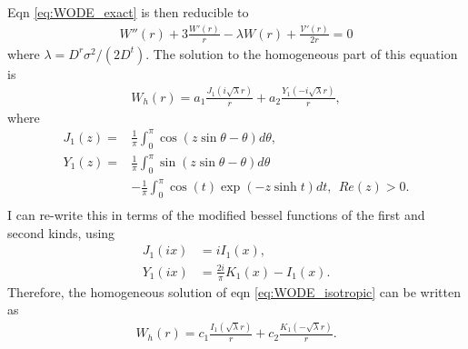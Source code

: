 \documentclass{article}
\begin{document}
Eqn \ref{eq:WODE_exact} is then reducible to
\begin{align}\label{eq:WODE_isotropic}
  W''(r)+3\frac{W'(r)}{r}-\lambda W(r)+\frac{\mathcal{V}'(r)}{2r}=0
\end{align}
where $\lambda=D^r\sigma^2/(2D^t)$. The solution to the homogeneous part of this equation
is
\begin{align}
  W_h(r)=a_1\frac{J_1(i\sqrt{\lambda}r)}{r}+a_2\frac{Y_1(-i\sqrt{\lambda}r)}{r},
\end{align}
where
\begin{align}
  J_1(z) =& \frac{1}{\pi}\int_0^{\pi}\cos(z\sin\theta-\theta)d\theta,\\
  Y_1(z) =& \frac{1}{\pi}\int_0^{\pi}\sin(z\sin\theta-\theta)d\theta\nonumber\\
          &-\frac{1}{\pi}\int_0^{\pi}\cos(t)\exp(-z\sinh t)dt,\:\:Re(z)>0.\\
\end{align}
I can re-write this in terms of the modified bessel functions of the first and second kinds,
using
\begin{align}
  J_1(ix) &= i I_1(x),\\
  Y_1(ix) &= \frac{2i}{\pi}K_1(x)-I_1(x).
\end{align}
Therefore, the homogeneous solution of eqn \ref{eq:WODE_isotropic} can be written as
\begin{align}
  W_h(r) = c_1\frac{I_1(\sqrt{\lambda}r)}{r} + c_2\frac{K_1(-\sqrt{\lambda}r)}{r}.
\end{align}

  
  



\begin{comment}
The second option is to say that, within the sum over the index $k$ in eqn
\ref{eq:WODE_exact}, the terms are essentially averaging out to zero unless $k=j$,
so
\begin{align}
  \bm{r}_{ik}\cdot\bm{u}_{ij}&\approx\delta_{jk}\bm{r}_{ik}\cdot\bm{u}_{ij},\\
  \bm{r}_{ik}\cdot\bm{r}_{ik}&\approx\delta_{jk}\bm{r}_{ik}\cdot\bm{r}_{ij}.
\end{align}
Inserting this approximation into eqn \ref{eq:WODE_exact} then yields
\begin{align}
  W''(r)+W'(r)\bigg(\frac{3}{r}-\mathcal{V}'(r)\bigg)-\bigg(\lambda
  + \frac{\mathcal{V}'(r)}{r}\bigg) W(r)+\frac{\mathcal{V}'(r)}{2r}=0.
\end{align}
\end{comment}
\end{document}
